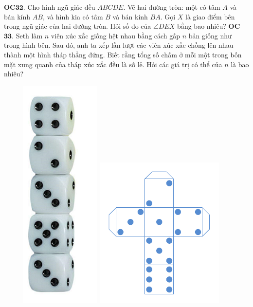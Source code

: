 \begin{multicols}{2}
\begin{figure}[H]
		\vspace*{-10pt}
	\end{figure}
	{\bf\color{cackithi}OC$\pmb{32.}$} Cho hình ngũ giác đều $ABCDE$. Vẽ hai đường tròn: một có
	tâm $A$ và bán kính $AB$, và hình kia có tâm $B$ và bán kính $BA$. Gọi $X$ là giao điểm bên trong ngũ giác của hai đường tròn.
	Hỏi số đo của $\angle DEX$ bằng bao nhiêu?
	\vskip 0.1cm
	{\bf\color{cackithi}OC$\pmb{33.}$} Seth làm $n$ viên xúc xắc giống hệt nhau bằng cách gấp $n$ bản giống như trong hình bên. Sau đó, anh ta xếp lần lượt các viên xúc xắc chồng lên nhau thành một hình tháp thẳng đứng.
	Biết rằng tổng số chấm ở mỗi một trong bốn mặt xung quanh của tháp xúc xắc đều là số lẻ. Hỏi các giá trị có thể của $n$ là bao nhiêu?
	\begin{figure}[H]
		\vspace*{-5pt}
		\centering
		\captionsetup{labelformat= empty, justification=centering}
		\includegraphics[height= 0.6\linewidth]{OC33}
		\includegraphics[height= 0.6\linewidth]{OC}
		\vspace*{-5pt}
	\end{figure}
\end{multicols}